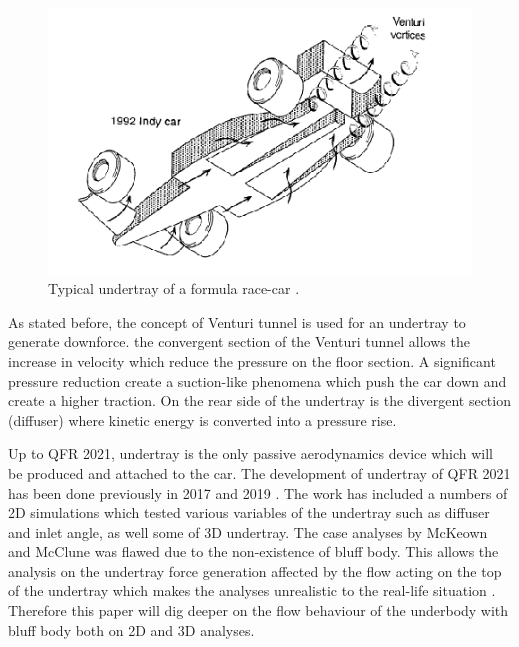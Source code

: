 \begin{figure}[!ht]
    \centering
    \includegraphics[scale = 0.8]{Figures/underbody.PNG}
    \caption{Typical undertray of a formula race-car \cite{Katz1995RaceSpeed}.}
    \label{fig:underbody}
\end{figure}

As stated before, the concept of Venturi tunnel is used for an undertray to generate downforce. the convergent section of the Venturi tunnel allows the increase in velocity which reduce the pressure on the floor section. A significant pressure reduction create a suction-like phenomena which push the car down and create a higher traction. On the rear side of the undertray is the divergent section (diffuser) where kinetic energy is converted into a pressure rise. 


Up to QFR 2021, undertray is the only passive aerodynamics device which will be produced and attached to the car. The development of undertray of QFR 2021 has been done previously in 2017 \cite{McKeown2018DesignCar} and 2019 \cite{McClune2018DesignCar}. The work has included a numbers of 2D simulations which tested various variables of the undertray such as diffuser and inlet angle, as well some of 3D undertray. The case analyses by McKeown \cite{McKeown2018DesignCar} and McClune \cite{McClune2018DesignCar} was flawed due to the non-existence of bluff body. This allows the analysis on the undertray force generation affected by the flow acting on the top of the undertray which makes the analyses unrealistic to the real-life situation \cite{Corr2017MechanicalAuthor}. Therefore this paper will dig deeper on the flow behaviour of the underbody with bluff body both on 2D and 3D analyses. 


